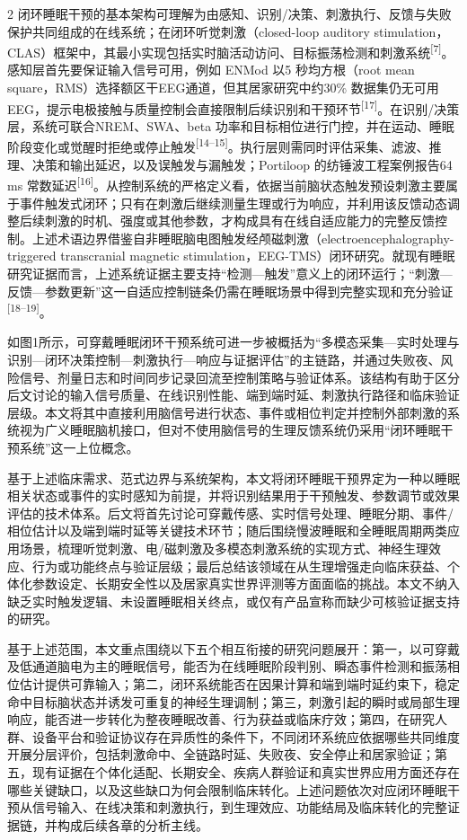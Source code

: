 \documentclass[UTF8,zihao=5,fontset=none]{ctexart}
\newcommand{\hei}{\CJKfamily{hei}}
\newcommand{\leveltwo}[1]{%
  \par\noindent{\hei\fontsize{10pt}{12pt}\selectfont\bfseries #1\par}}
\newcommand{\refcite}[1]{\nolinebreak[4]\textsuperscript{[#1]}}
\begin{document}
\begin{multicols}{2}
闭环睡眠干预的基本架构可理解为由感知、识别/决策、刺激执行、反馈与失败保护共同组成的在线系统；在闭环听觉刺激（closed-loop auditory stimulation，CLAS）框架中，其最小实现包括实时脑活动访问、目标振荡检测和刺激系统\refcite{7}。感知层首先要保证输入信号可用，例如 ENMod 以5 秒均方根（root mean square，RMS）选择额区干EEG通道，但其居家研究中约30\% 数据集仍无可用EEG，提示电极接触与质量控制会直接限制后续识别和干预环节\refcite{17}。在识别/决策层，系统可联合NREM、SWA、beta 功率和目标相位进行门控，并在运动、睡眠阶段变化或觉醒时拒绝或停止触发\refcite{14--15}。执行层则需同时评估采集、滤波、推理、决策和输出延迟，以及误触发与漏触发；Portiloop 的纺锤波工程案例报告64 ms 常数延迟\refcite{16}。从控制系统的严格定义看，依据当前脑状态触发预设刺激主要属于事件触发式闭环；只有在刺激后继续测量生理或行为响应，并利用该反馈动态调整后续刺激的时机、强度或其他参数，才构成具有在线自适应能力的完整反馈控制。上述术语边界借鉴自非睡眠脑电图触发经颅磁刺激（electroencephalography-triggered transcranial magnetic stimulation，EEG-TMS）闭环研究。就现有睡眠研究证据而言，上述系统证据主要支持“检测—触发”意义上的闭环运行；“刺激—反馈—参数更新”这一自适应控制链条仍需在睡眠场景中得到完整实现和充分验证\refcite{18--19}。

如图1所示，可穿戴睡眠闭环干预系统可进一步被概括为“多模态采集—实时处理与识别—闭环决策控制—刺激执行—响应与证据评估”的主链路，并通过失败夜、风险信号、剂量日志和时间同步记录回流至控制策略与验证体系。该结构有助于区分后文讨论的输入信号质量、在线识别性能、端到端时延、刺激执行路径和临床验证层级。本文将其中直接利用脑信号进行状态、事件或相位判定并控制外部刺激的系统视为广义睡眠脑机接口，但对不使用脑信号的生理反馈系统仍采用“闭环睡眠干预系统”这一上位概念。\par

\leveltwo{1.4 本文综述范围与结构安排}

基于上述临床需求、范式边界与系统架构，本文将闭环睡眠干预界定为一种以睡眠相关状态或事件的实时感知为前提，并将识别结果用于干预触发、参数调节或效果评估的技术体系。后文将首先讨论可穿戴传感、实时信号处理、睡眠分期、事件/相位估计以及端到端时延等关键技术环节；随后围绕慢波睡眠和全睡眠周期两类应用场景，梳理听觉刺激、电/磁刺激及多模态刺激系统的实现方式、神经生理效应、行为或功能终点与验证层级；最后总结该领域在从生理增强走向临床获益、个体化参数设定、长期安全性以及居家真实世界评测等方面面临的挑战。本文不纳入缺乏实时触发逻辑、未设置睡眠相关终点，或仅有产品宣称而缺少可核验证据支持的研究。

基于上述范围，本文重点围绕以下五个相互衔接的研究问题展开：第一，以可穿戴及低通道脑电为主的睡眠信号，能否为在线睡眠阶段判别、瞬态事件检测和振荡相位估计提供可靠输入；第二，闭环系统能否在因果计算和端到端时延约束下，稳定命中目标脑状态并诱发可重复的神经生理调制；第三，刺激引起的瞬时或局部生理响应，能否进一步转化为整夜睡眠改善、行为获益或临床疗效；第四，在研究人群、设备平台和验证协议存在异质性的条件下，不同闭环系统应依据哪些共同维度开展分层评价，包括刺激命中、全链路时延、失败夜、安全停止和居家验证；第五，现有证据在个体化适配、长期安全、疾病人群验证和真实世界应用方面还存在哪些关键缺口，以及这些缺口为何会限制临床转化。上述问题依次对应闭环睡眠干预从信号输入、在线决策和刺激执行，到生理效应、功能结局及临床转化的完整证据链，并构成后续各章的分析主线。\par


\end{multicols}
\end{document}
